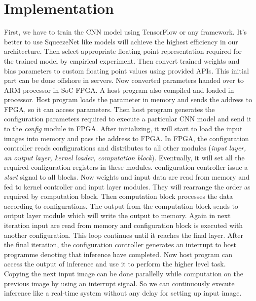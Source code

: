\documentclass[conference]{IEEEtran}
\begin{document}
\section{Implementation}

First, we have to train the CNN model using TensorFlow or any framework. It's better to use SqueezeNet like models will achieve the highest efficiency in our architecture. Then select appropriate floating point representation required for the trained model by empirical experiment. Then convert trained weights and bias parameters to custom floating point values using provided APIs. This initial part can be done offshore in servers. Now converted parameters handed over to ARM processor in SoC FPGA. A host program also compiled and loaded in processor. Host program loads the parameter in memory and sends the address to FPGA, so it can access parameters. Then host program generates the configuration parameters required to execute a particular CNN model and send it to the \textit{config} module in FPGA. After initializing, it will start to load the input images into memory and pass the address to FPGA. 
In FPGA, the configuration controller reads configurations and distributes to all other modules (\textit{input layer, an output layer, kernel loader, computation block}). Eventually, it will set all the required configuration registers in these modules. configuration controller issue a \textit{start} signal to all blocks. Now weights and input data are read from memory and fed to kernel controller and input layer modules. They will rearrange the order as required by computation block. Then computation block processes the data according to configurations. The output from the computation block sends to output layer module which will write the output to memory. Again in next iteration input are read from memory and configuration block is executed with another configuration. This loop continues until it reaches the final layer. After the final iteration, the configuration controller generates an interrupt to host programme denoting that inference have completed. Now host program can access the output of inference and use it to perform the higher level task. Copying the next input image can be done parallelly while computation on the previous image by using an interrupt signal. So we can continuously execute inference like a real-time system without any delay for setting up input image.
\end{document}
